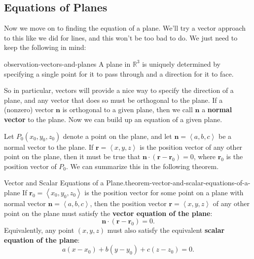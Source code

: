 \documentclass[10pt,]{book}
\newcommand{\terminology}[1]{\textbf{#1}}
\numberwithin{equation}{section}
\newcommand{\RR}{\mathbb{R}}
\newcommand{\vv}[1]{\mathbf{#1}}
\newcommand{\dotprod}[1]{\left\langle #1 \right\rangle}
\begin{document}
\subsection[{Equations of Planes}]{Equations of Planes}\label{subsection-equations-of-planes}
\hypertarget{p-1215}{}%
Now we move on to finding the equation of a plane. We'll try a vector approach to this like we did for lines, and this won't be too bad to do. We just need to keep the following in mind:%
\begin{observation}{}{observation-vectors-and-planes}%
\hypertarget{p-1216}{}%
A plane in \(\RR^{3}\) is uniquely determined by specifying a single point for it to pass through and a direction for it to face.%
\end{observation}
\hypertarget{p-1217}{}%
So in particular, vectors will provide a nice way to specify the direction of a plane, and any vector that does so must be orthogonal to the plane. If a (nonzero) vector \(\vv{n}\) is orthogonal to a given plane, then we call \(\vv{n}\) a \terminology{normal vector} to the plane. Now we can build up an equation of a given plane.%
\par
\hypertarget{p-1218}{}%
Let \(P_{0}(x_{0},y_{0},z_{0})\) denote a point on the plane, and let \(\vv{n} = \dotprod{a,b,c}\) be a normal vector to the plane. If \(\vv{r}=\dotprod{x,y,z}\) is the position vector of any other point on the plane, then it must be true that \(\vv{n}\cdot(\vv{r}-\vv{r}_{0}) = 0\), where \(\vv{r}_{0}\) is the position vector of \(P_{0}\). We can summarize this in the following theorem.%
\begin{theorem}{Vector and Scalar Equations of a Plane.}{}{theorem-vector-and-scalar-equations-of-a-plane}%
\hypertarget{p-1219}{}%
If \(\vv{r}_{0} = \dotprod{x_{0},y_{0},z_{0}}\) is the position vector for some point on a plane with normal vector \(\vv{n} = \dotprod{a,b,c}\), then the position vector \(\vv{r} = \dotprod{x,y,z}\) of any other point on the plane must satisfy the \terminology{vector equation of the plane}:%
%
\begin{equation*}
\vv{n}\cdot(\vv{r}-\vv{r}_{0}) = 0.
\end{equation*}
\hypertarget{p-1220}{}%
Equivalently, any point \((x,y,z)\) must also satisfy the equivalent \terminology{scalar equation of the plane}:%
%
\begin{equation*}
a(x-x_{0})+b(y-y_{0})+c(z-z_{0}) = 0.
\end{equation*}
\end{theorem}
\end{document}
